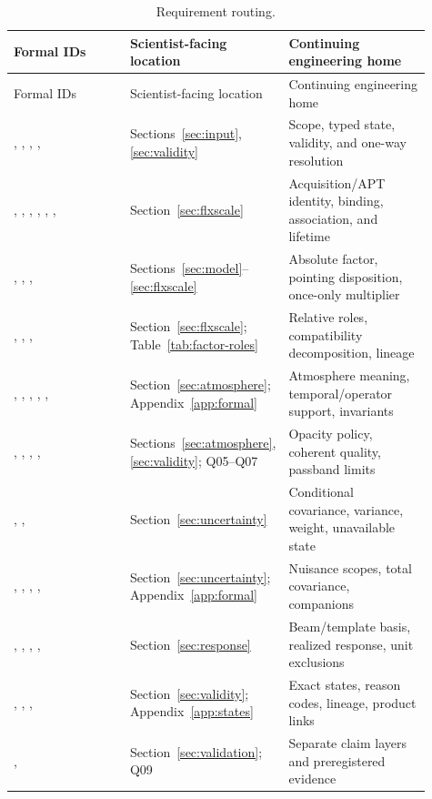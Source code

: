 \begin{longtable}{L{0.30\linewidth}L{0.26\linewidth}L{0.35\linewidth}}
\caption{Requirement routing.}\\
\toprule Formal IDs & Scientist-facing location & Continuing engineering home \\
\midrule\endfirsthead\toprule Formal IDs & Scientist-facing location & Continuing engineering home \\
\midrule\endhead
{}, , , ,  & Sections~\ref{sec:input}, \ref{sec:validity} & Scope, typed state, validity, and one-way resolution \\
, , , , , ,  & Section~\ref{sec:flxscale} & Acquisition/APT identity, binding, association, and lifetime \\
, , ,  & Sections~\ref{sec:model}--\ref{sec:flxscale} & Absolute factor, pointing disposition, once-only multiplier \\
, , ,  & Section~\ref{sec:flxscale}; Table~\ref{tab:factor-roles} & Relative roles, compatibility decomposition, lineage \\
, , , , ,  & Section~\ref{sec:atmosphere}; Appendix~\ref{app:formal} & Atmosphere meaning, temporal/operator support, invariants \\
, , , ,  & Sections~\ref{sec:atmosphere}, \ref{sec:validity}; Q05--Q07 & Opacity policy, coherent quality, passband limits \\
, ,  & Section~\ref{sec:uncertainty} & Conditional covariance, variance, weight, unavailable state \\
, , , ,  & Section~\ref{sec:uncertainty}; Appendix~\ref{app:formal} & Nuisance scopes, total covariance, companions \\
, , , ,  & Section~\ref{sec:response} & Beam/template basis, realized response, unit exclusions \\
, , ,  & Section~\ref{sec:validity}; Appendix~\ref{app:states} & Exact states, reason codes, lineage, product links \\
,  & Section~\ref{sec:validation}; Q09 & Separate claim layers and preregistered evidence \\
\bottomrule
\end{longtable}

